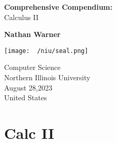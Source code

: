 \documentclass{report}
\title{\Huge{}}
\author{\huge{Nathan Warner}}
\date{\huge{}}
\begin{document}
        \begin{titlepage}
       \begin{center}
           \vspace*{1cm}
    
           \textbf{Comprehensive Compendium:} \\
            Calculus II
    
           \vspace{0.5cm}
            
                
           \vspace{1.5cm}
    
           \textbf{Nathan Warner}
    
           \vfill
                
                
           \vspace{0.8cm}
         
           \texttt{[image: ~/niu/seal.png]}
                
           Computer Science \\
           Northern Illinois University\\
           August 28,2023 \\
           United States\\
           
                
       \end{center}
    \end{titlepage}
    \tableofcontents
    \pagebreak \bigbreak \noindent
    \section{\LARGE Calc II}
    \bigbreak \noindent 
\end{document}
